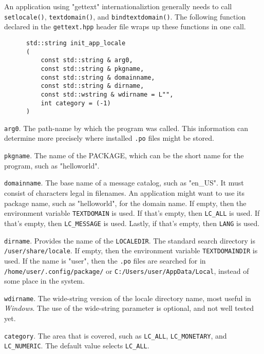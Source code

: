    An application using "gettext" internationaliztion generally needs
   to call \texttt{setlocale()},
   \texttt{textdomain()}, and \texttt{bindtextdomain()}.
   The following function declared in the \texttt{gettext.hpp}
   header file wraps up these functions in one call.

   \begin{verbatim}
      std::string init_app_locale
      (
          const std::string & arg0,
          const std::string & pkgname,
          const std::string & domainname,
          const std::string & dirname,
          const std::wstring & wdirname = L"",
          int category = (-1)
      )
   \end{verbatim}

   \texttt{arg0}.
   The path-name by which the program was called. This information
   can determine more precisely where installed \texttt{.po} files might be
   stored.

   \texttt{pkgname}.
   The name of the PACKAGE, which can be the short name for
   the program, such as "helloworld".

   \texttt{domainname}.
   The base name of a message catalog, such as "en\_US".
   It must consist of characters legal in filenames.
   An application might want to use its
   package name, such as "helloworld", for the domain name.
   If empty, then the environment variable \texttt{TEXTDOMAIN} is used.
   If that's empty, then \texttt{LC\_ALL} is used.
   If that's empty, then \texttt{LC\_MESSAGE} is used.
   Lastly, if that's empty, then \texttt{LANG} is used.

   \texttt{dirname}.
   Provides the name of the \texttt{LOCALEDIR}.
   The standard search directory is \texttt{/user/share/locale}.
   If empty, then the environment variable
   \texttt{TEXTDOMAINDIR} is used.
   If the name is "user", then the \texttt{.po} files are searched
   for in \texttt{/home/user/.config/package/} or
   \texttt{C:/Users/user/AppData/Local}, instead of some
   place in the system.
  
   \texttt{wdirname}.
   The wide-string version of the locale directory name, most useful
   in \textsl{Windows}.
   The use of the wide-string parameter is optional,
   and not well tested yet.

   \texttt{category}.
   The area that is covered, such as
   \texttt{LC\_ALL}, \texttt{LC\_MONETARY}, and \texttt{LC\_NUMERIC}.
   The default value selects \texttt{LC\_ALL}.

